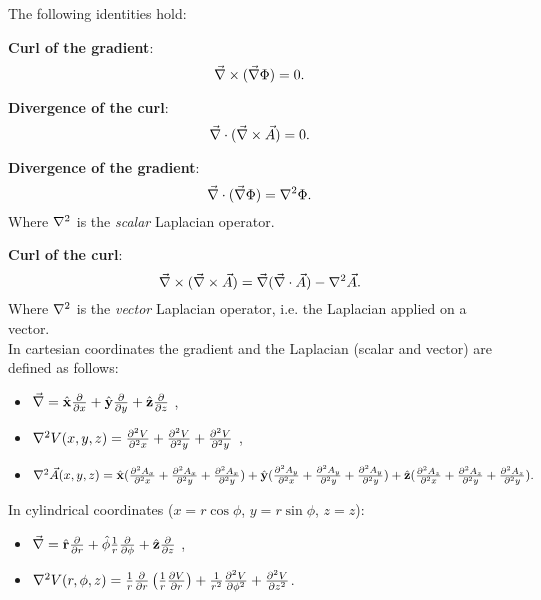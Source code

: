 \documentclass[10pt,a4paper]{report}
\def\Nabla{\ensuremath\vec{\nabla}}
\def\bm{\ensuremath\mathbf}
\def\curl{\ensuremath\Nabla\times}
\def\div{\ensuremath\Nabla\cdot}
\def\lap{\ensuremath\nabla^2}
\def\vlap{\ensuremath\nabla^2}
\def\x{\ensuremath\hat{\bm{x}}}
\def\y{\ensuremath\hat{\bm{y}}}
\def\z{\ensuremath\hat{\bm{z}}}
\begin{document}
The following identities hold:

\textbf{Curl of the gradient}:
\begin{equation}
  \label{eq:curlofgradient}
  \curl (\Nabla\Phi) = 0 .
\end{equation}

\textbf{Divergence of the curl}:
\begin{equation}
  \label{eq:divergenceofcurl}
  \div (\curl \vec{A}) = 0 .
\end{equation}

\textbf{Divergence of the gradient}:
\begin{equation}
  \label{eq:divergenceofgradient}
  \div (\Nabla \Phi) = \lap \Phi.
\end{equation}
Where $\lap$ is the \emph{scalar} Laplacian operator. 

\textbf{Curl of the curl}:
\begin{equation}
  \label{eq:curlofcurl}
  \curl (\curl \vec{A}) = \Nabla (\div \vec{A})-\vlap \vec{A}. 
\end{equation}
Where $\vlap$ is the \emph{vector} Laplacian operator, i.e. the Laplacian applied on a vector. 
\\

In cartesian coordinates the gradient and the Laplacian (scalar and vector) are defined as follows: 
\begin{itemize}
  \item $\Nabla = \x \frac{\partial}{\partial x} + \y \frac{\partial}{\partial y}+\z\frac{\partial}{\partial z}$ ,
  \item $\lap V(x,y,z) = \frac{\partial^2 V}{\partial^2 x}+\frac{\partial^2 V}{\partial^2 y} +\frac{\partial^2 V}{\partial^2 y}$ ,
  \item $\vlap \vec{A}(x,y,z) =\x ( \frac{\partial^2 A_x}{\partial^2 x}+\frac{\partial^2 A_x}{\partial^2 y} +\frac{\partial^2 A_x}{\partial^2 y}) + \y(\frac{\partial^2 A_y}{\partial^2 x}+\frac{\partial^2 A_y}{\partial^2 y} +\frac{\partial^2 A_y}{\partial^2 y})+\z(\frac{\partial^2 A_z}{\partial^2 x}+\frac{\partial^2 A_z}{\partial^2 y} +\frac{\partial^2 A_z}{\partial^2 y}).$
\end{itemize}

In cylindrical coordinates ($x=r\cos\phi$, $y = r\sin\phi$, $z = z$): 
\begin{itemize}
  \item {$\Nabla = \hat{\bm {r}} \frac{\partial }{\partial r}+\hat{\bm{\phi}} \frac{1}{r}\frac{\partial}{\partial \bm{\phi}} + \hat{\bm{z}}\frac{\partial}{\partial z} $} ,
  \item {$\lap V(r,\phi,z) = \frac{1}{r}\frac{\partial}{\partial r}\left ( \frac{1}{r}\frac{\partial V}{\partial r}\right ) + \frac{1}{r^2}\frac{\partial ^2 V}{\partial \phi ^2} + \frac{\partial ^2 V }{\partial z^2} $.}
\end{itemize}
\end{document}
